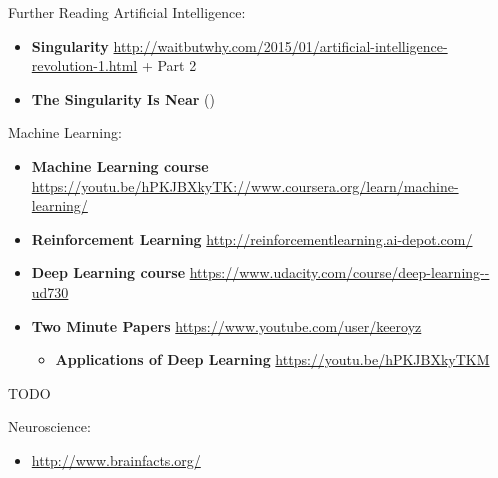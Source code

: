 \documentclass{beamer}
\newcommand{\todo}{\alert{TODO}}
\begin{document}
  \begin{frame}[allowframebreaks]{Further Reading}
    Artificial Intelligence:
    \begin{itemize}
      \item \textbf{Singularity} \url{http://waitbutwhy.com/2015/01/artificial-intelligence-revolution-1.html} + Part 2
      \item \textbf{The Singularity Is Near} (\cite{Kurzweil2005singularity})
    \end{itemize}

    Machine Learning:
    \begin{itemize}
      \item \textbf{Machine Learning course} \url{https://youtu.be/hPKJBXkyTK://www.coursera.org/learn/machine-learning/}
      \item \textbf{Reinforcement Learning} \url{http://reinforcementlearning.ai-depot.com/}
      \item \textbf{Deep Learning course} \url{https://www.udacity.com/course/deep-learning--ud730}
      \item \textbf{Two Minute Papers} \url{https://www.youtube.com/user/keeroyz}
        \begin{itemize}
          \item \textbf{Applications of Deep Learning} \url{https://youtu.be/hPKJBXkyTKM}
        \end{itemize}
    \end{itemize}
    \todo

    Neuroscience:
    \begin{itemize}
      \item \url{http://www.brainfacts.org/}
    \end{itemize}
  \end{frame}
\end{document}
